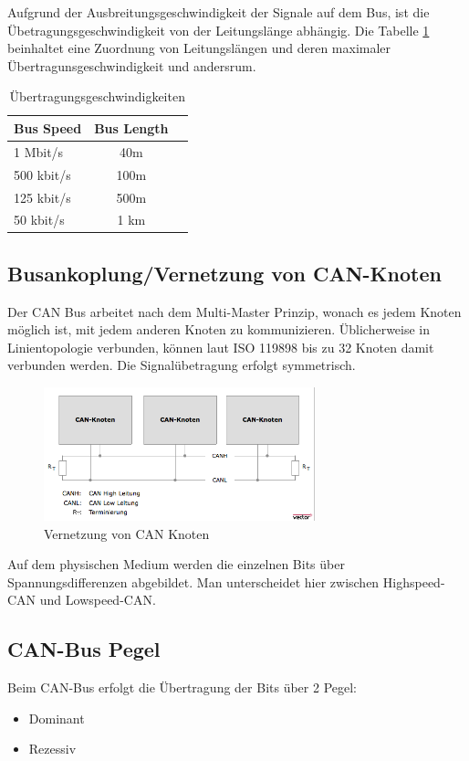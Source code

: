 Aufgrund der Ausbreitungsgeschwindigkeit der Signale auf dem Bus, ist die 
Übetragungsgeschwindigkeit von der Leitungslänge abhängig. Die Tabelle 
\ref{tab:speed} beinhaltet eine Zuordnung von Leitungslängen und deren 
maximaler Übertragunsgeschwindigkeit und andersrum.

\begin{table}[h]
	\centering
	\begin{tabular}{lcr}
		Bus Speed & Bus Length \\
		\hline
		1 Mbit/s & 40m \\
		500 kbit/s & 100m \\
		125 kbit/s & 500m \\
		50 kbit/s & 1 km \\
	\end{tabular}
	\label{tab:speed}
	\caption{Übertragungsgeschwindigkeiten}
\end{table}

\subsection{Busankoplung/Vernetzung von CAN-Knoten}

Der CAN Bus arbeitet nach dem Multi-Master Prinzip, wonach es jedem Knoten 
möglich ist, mit jedem anderen Knoten zu kommunizieren. Üblicherweise in 
Linientopologie verbunden, können laut ISO 119898 bis zu 32 Knoten damit
verbunden werden. Die Signalübetragung erfolgt symmetrisch.

\begin{figure}[h] 
\centering
\includegraphics[width=0.7\textwidth]{figures/cannet}
\caption{Vernetzung von CAN Knoten \citep{VEC}} 
\label{data}
\end{figure} 

Auf dem physischen Medium werden die einzelnen Bits über Spannungsdifferenzen
abgebildet. Man unterscheidet hier zwischen Highspeed-CAN und Lowspeed-CAN.

\clearpage
\subsection{CAN-Bus Pegel} Beim CAN-Bus erfolgt die Übertragung der
Bits über 2 Pegel: 
\begin{itemize} 
\item Dominant 
\item Rezessiv
\end{itemize}

